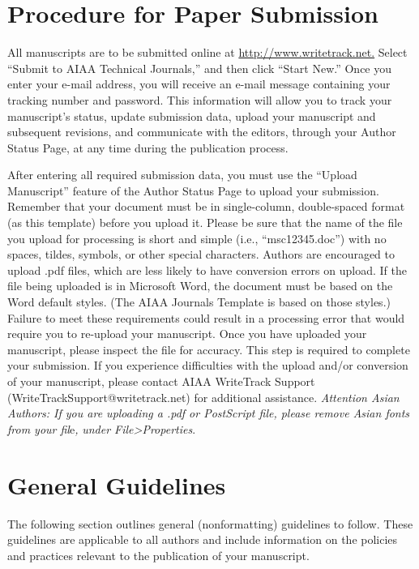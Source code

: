 \documentclass{AIAA}
\begin{document}
\section{Procedure for Paper Submission}
All manuscripts are to be submitted online at \url{http://www.writetrack.net.} Select ``Submit to AIAA Technical Journals,'' and then click ``Start New.'' Once you enter your e-mail address, you will receive an e-mail message containing your tracking number and password. This information will allow you to track your manuscript's status, update submission data, upload your manuscript and subsequent revisions, and communicate with the editors, through your Author Status Page, at any time during the publication process.

After entering all required submission data, you must use the ``Upload Manuscript'' feature of the Author Status Page to upload your submission. Remember that your document must be in single-column, double-spaced format (as this template) before you upload it. Please be sure that the name of the file you upload for processing is short and simple (i.e., ``msc12345.doc'') with no spaces, tildes, symbols, or other special characters. Authors are encouraged to upload .pdf files, which are less likely to have conversion errors on upload. If the file being uploaded is in Microsoft Word, the document must be based on the Word default styles. (The AIAA Journals Template is based on those styles.) Failure to meet these requirements could result in a processing error that would require you to re-upload your manuscript. Once you have uploaded your manuscript, please inspect the file for accuracy. This step is required to complete your submission. If you experience difficulties with the upload and/or conversion of your manuscript, please contact AIAA WriteTrack Support (WriteTrackSupport@writetrack.net) for additional assistance.
\textit{Attention Asian Authors: If you are uploading a .pdf or PostScript file, please remove Asian fonts from your fil}e\textit{,} \textit{under File>Properties}.

\section{General Guidelines}
The following section outlines general (nonformatting) guidelines to follow. These guidelines are applicable to all authors and include information on the policies and practices relevant to the publication of your manuscript.
\end{document}
